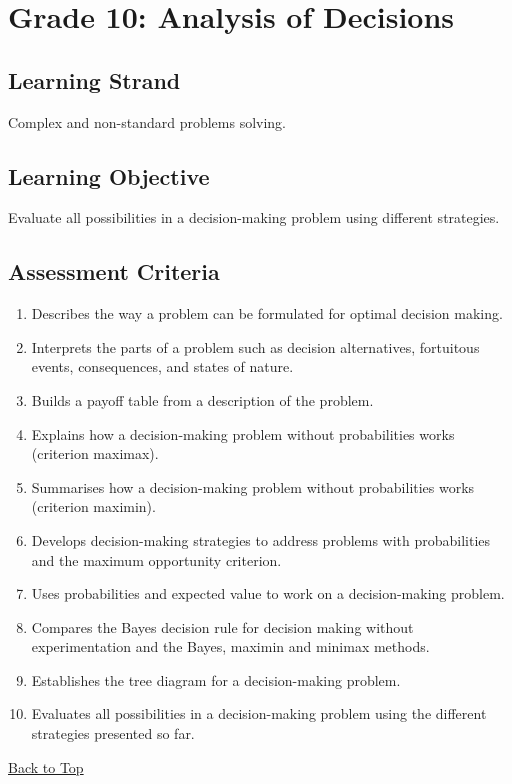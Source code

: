 \section{Grade 10: Analysis of Decisions}\label{sec:grade10-term2-overview}

\subsection{Learning Strand}\label{sec:grade10-term2-strand}

Complex and non-standard problems solving.

\subsection{Learning Objective}\label{sec:grade10-term2-objective}

Evaluate all possibilities in a decision-making problem using different strategies.

\subsection{Assessment Criteria}\label{sec:grade10-term2-criteria}

\begin{enumerate}
	\item Describes the way a problem can be formulated for optimal decision making.
	\item Interprets the parts of a problem such as decision alternatives, fortuitous events, consequences, and states of nature.
	\item Builds a payoff table from a description of the problem.
	\item Explains how a decision-making problem without probabilities works (criterion maximax).
	\item Summarises how a decision-making problem without probabilities works (criterion maximin).
	\item Develops decision-making strategies to address problems with probabilities and the maximum opportunity criterion.
	\item Uses probabilities and expected value to work on a decision-making problem.
	\item Compares the Bayes decision rule for decision making without experimentation and the Bayes, maximin and minimax methods.
	\item Establishes the tree diagram for a decision-making problem.
	\item Evaluates all possibilities in a decision-making problem using the different strategies presented so far.
\end{enumerate}

\vspace{6pt}
\noindent\hyperref[table-of-contents]{Back to Top}
